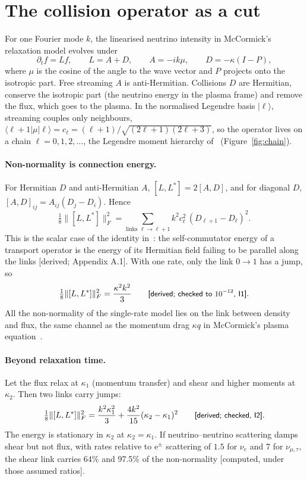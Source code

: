 \documentclass[11pt]{article}
\newcommand{\grade}[1]{\textsf{\small[#1]}}
\begin{document}
\section{The collision operator as a cut}\label{sec:cut}

For one Fourier mode $k$, the linearised neutrino intensity in McCormick's relaxation model evolves under
\begin{equation}
\partial_t f=L f,\qquad L=A+D,\qquad A=-ik\mu,\qquad D=-\kappa(I-P),
\end{equation}
where $\mu$ is the cosine of the angle to the wave vector and $P$ projects onto the isotropic part. Free streaming $A$ is anti-Hermitian. Collisions $D$ are Hermitian, conserve the isotropic part (the neutrino energy in the plasma frame) and remove the flux, which goes to the plasma. In the normalised Legendre basis $|\ell\rangle$, streaming couples only neighbours, $\langle\ell+1|\mu|\ell\rangle=c_\ell=(\ell+1)/\sqrt{(2\ell+1)(2\ell+3)}$, so the operator lives on a chain $\ell=0,1,2,\dots$, the Legendre moment hierarchy of~\cite{MB} (Figure~\ref{fig:chain}).

\paragraph{Non-normality is connection energy.} For Hermitian $D$ and anti-Hermitian $A$, $[L,L^\ast]=2[A,D]$, and for diagonal $D$, $[A,D]_{ij}=A_{ij}(D_j-D_i)$. Hence
\begin{equation}
\tfrac18\lVert[L,L^\ast]\rVert_F^2=\sum_{\text{links }\ell\to\ell+1}k^2c_\ell^2\,(D_{\ell+1}-D_\ell)^2 .
\end{equation}
This is the scalar case of the identity in~\cite{CE}: the self-commutator energy of a transport operator is the energy of its Hermitian field failing to be parallel along the links \grade{derived; Appendix A.1}. With one rate, only the link $0\to1$ has a jump, so
\begin{equation}
\tfrac18\lVert[L,L^\ast]\rVert_F^2=\frac{\kappa^2k^2}{3}\qquad\text{\grade{derived; checked to $10^{-12}$, I1}}.
\end{equation}
All the non-normality of the single-rate model lies on the link between density and flux, the same channel as the momentum drag $\kappa q$ in McCormick's plasma equation~\cite[Eq.~(6)]{McC}.

\paragraph{Beyond relaxation time.} Let the flux relax at $\kappa_1$ (momentum transfer) and shear and higher moments at $\kappa_2$. Then two links carry jumps:
\begin{equation}
\tfrac18\lVert[L,L^\ast]\rVert_F^2=\frac{k^2\kappa_1^2}{3}+\frac{4k^2}{15}(\kappa_2-\kappa_1)^2\qquad\text{\grade{derived; checked, I2}}.
\end{equation}
The energy is stationary in $\kappa_2$ at $\kappa_2=\kappa_1$. If neutrino--neutrino scattering damps shear but not flux, with rates relative to e$^\pm$ scattering of $1.5$ for $\nu_e$ and $7$ for $\nu_{\mu,\tau}$, the shear link carries 64\% and 97.5\% of the non-normality \grade{computed, under those assumed ratios}.
\end{document}
